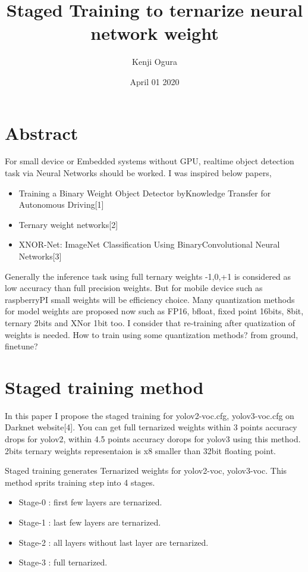 \documentclass[twocolumn]{article}
\begin{document}
\title{Staged Training to ternarize neural network weight}
\author{Kenji Ogura}
\date{April 01 2020}
\maketitle

\section{Abstract}

For small device or Embedded systems without GPU, realtime object detection task via Neural Networks should be worked.
I was inspired below papers,
\begin{itemize}
\item
 Training a Binary Weight Object Detector byKnowledge Transfer for Autonomous Driving[1]
\item
 Ternary weight networks[2]
\item
 XNOR-Net: ImageNet Classification Using BinaryConvolutional Neural Networks[3]
\end{itemize}

Generally the inference task using full ternary weights -1,0,+1 is considered as low accuracy than full precision weights.
But for mobile device such as raspberryPI small weights will be efficiency choice.
Many quantization methods for model weights are proposed now such as FP16, bfloat, fixed point 16bits, 8bit, ternary 2bits and XNor 1bit too.
I consider that re-training after quatization of weights is needed.
How to train using some quantization methods? from ground, finetune?

\section{Staged training method}
In this paper I propose the staged training for yolov2-voc.cfg, yolov3-voc.cfg on Darknet website[4].
You can get full ternarized weights within 3 points accuracy drops for yolov2, within 4.5 points accuracy dorops for yolov3 using this method.
2bits ternary weights representaion is x8 smaller than 32bit floating point.

Staged training generates Ternarized weights for yolov2-voc, yolov3-voc.
This method sprits training step into 4 stages.

\begin{itemize}
\item Stage-0 : first few layers are ternarized.
\item Stage-1 : last few layers are ternarized.
\item Stage-2 : all layers without last layer are ternarized.
\item Stage-3 : full ternarized.
\end{itemize}
\end{document}
